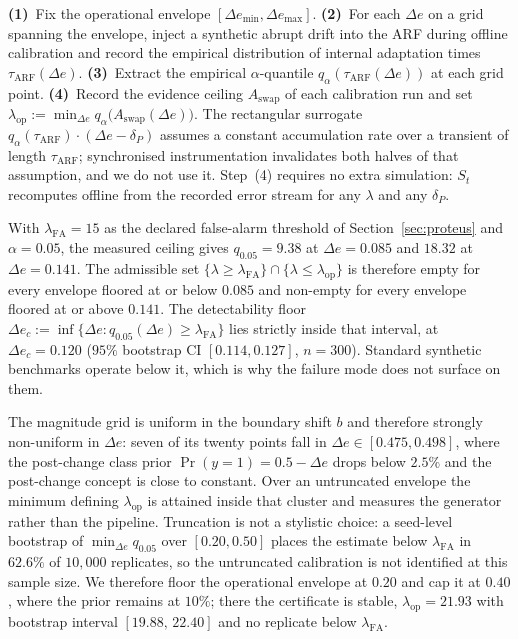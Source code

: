 \documentclass[smallextended]{svjour3}
\newcommand{\LambdaFA}{15}                   %
\newcommand{\LambdaOpNarrow}{21.93}          %
\newcommand{\LambdaOpNarrowCI}{[19.88,\,22.40]}
\newcommand{\WideEnvUnstable}{62.6}          %
\newcommand{\EnvLo}{0.20}\newcommand{\EnvHi}{0.40}
\newcommand{\DeFloorLo}{0.085}\newcommand{\DeFloorHi}{0.141}
\newcommand{\QlowFloorLo}{9.38}\newcommand{\QlowFloorHi}{18.32}
\newcommand{\DeCrit}{0.120}                  %
\newcommand{\DeCritCI}{[0.114, 0.127]}       %
\begin{document}
\begin{definition}
  \textbf{(1)}~Fix the operational envelope $[\Delta e_{\min}, \Delta e_{\max}]$. \textbf{(2)}~For each $\Delta e$ on a grid spanning the envelope, inject a synthetic abrupt drift into the ARF during offline calibration and record the empirical distribution of internal adaptation times $\tau_{\mathrm{ARF}}(\Delta e)$. \textbf{(3)}~Extract the empirical $\alpha$-quantile $q_{\alpha}(\tau_{\mathrm{ARF}}(\Delta e))$ at each grid point. \textbf{(4)}~Record the evidence ceiling $A_{\mathrm{swap}}$ of each calibration run and set $\lambda_{\mathrm{op}} := \min_{\Delta e} q_{\alpha}\bigl(A_{\mathrm{swap}}(\Delta e)\bigr)$. The rectangular surrogate $q_{\alpha}(\tau_{\mathrm{ARF}})\cdot(\Delta e - \delta_P)$ assumes a constant accumulation rate over a transient of length $\tau_{\mathrm{ARF}}$; synchronised instrumentation invalidates both halves of that assumption, and we do not use it. Step~(4) requires no extra simulation: $S_t$ recomputes offline from the recorded error stream for any $\lambda$ and any $\delta_P$.

\begin{empresult}\label{res:tension}
  With $\lambda_{\mathrm{FA}} = \LambdaFA$ as the declared false-alarm threshold of Section~\ref{sec:proteus} and $\alpha = 0.05$, the measured ceiling gives $q_{0.05} = \QlowFloorLo$ at $\Delta e = \DeFloorLo$ and $\QlowFloorHi$ at $\Delta e = \DeFloorHi$. The admissible set $\{\lambda \ge \lambda_{\mathrm{FA}}\} \cap \{\lambda \le \lambda_{\mathrm{op}}\}$ is therefore empty for every envelope floored at or below $\DeFloorLo$ and non-empty for every envelope floored at or above $\DeFloorHi$. The detectability floor $\Delta e_c := \inf\{\Delta e : q_{0.05}(\Delta e) \ge \lambda_{\mathrm{FA}}\}$ lies strictly inside that interval, at $\Delta e_c = \DeCrit$ ($95\%$ bootstrap CI $\DeCritCI$, $n=300$). Standard synthetic benchmarks operate below it, which is why the failure mode does not surface on them.
\end{empresult}

\begin{remark}\label{rem:envelope}
  The magnitude grid is uniform in the boundary shift $b$ and therefore strongly non-uniform in $\Delta e$: seven of its twenty points fall in $\Delta e \in [0.475, 0.498]$, where the post-change class prior $\Pr(y=1) = 0.5 - \Delta e$ drops below $2.5\%$ and the post-change concept is close to constant. Over an untruncated envelope the minimum defining $\lambda_{\mathrm{op}}$ is attained inside that cluster and measures the generator rather than the pipeline. Truncation is not a stylistic choice: a seed-level bootstrap of $\min_{\Delta e} q_{0.05}$ over $[\EnvLo, 0.50]$ places the estimate below $\lambda_{\mathrm{FA}}$ in $\WideEnvUnstable\%$ of $10{,}000$ replicates, so the untruncated calibration is not identified at this sample size. We therefore floor the operational envelope at $\EnvLo$ and cap it at $\EnvHi$, where the prior remains at $10\%$; there the certificate is stable, $\lambda_{\mathrm{op}} = \LambdaOpNarrow$ with bootstrap interval $\LambdaOpNarrowCI$ and no replicate below $\lambda_{\mathrm{FA}}$.
\end{remark}


\end{definition}
\end{document}
